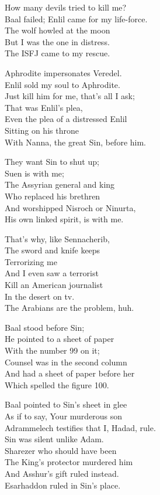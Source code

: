 \documentclass[
]{book}
\begin{document}
How many devils tried to kill me?\\
Baal failed; Enlil came for my life-force.\\
The wolf howled at the moon\\
But I was the one in distress.\\
The ISFJ came to my rescue.

Aphrodite impersonates Veredel.\\
Enlil sold my soul to Aphrodite.\\
Just kill him for me, that's all I ask;\\
That was Enlil's plea,\\
Even the plea of a distressed Enlil\\
Sitting on his throne\\
With Nanna, the great Sin, before him.

They want Sin to shut up;\\
Suen is with me;\\
The Assyrian general and king\\
Who replaced his brethren\\
And worshipped Nisroch or Ninurta,\\
His own linked spirit, is with me.

That's why, like Sennacherib,\\
The sword and knife keeps\\
Terrorizing me\\
And I even saw a terrorist\\
Kill an American journalist\\
In the desert on tv.\\
The Arabians are the problem, huh.

Baal stood before Sin;\\
He pointed to a sheet of paper\\
With the number 99 on it;\\
Counsel was in the second column\\
And had a sheet of paper before her\\
Which spelled the figure 100.

Baal pointed to Sin's sheet in glee\\
As if to say, Your murderous son\\
Adrammelech testifies that I, Hadad, rule.\\
Sin was silent unlike Adam.\\
Sharezer who should have been\\
The King's protector murdered him\\
And Asshur's gift ruled instead.\\
Esarhaddon ruled in Sin's place.
\end{document}
